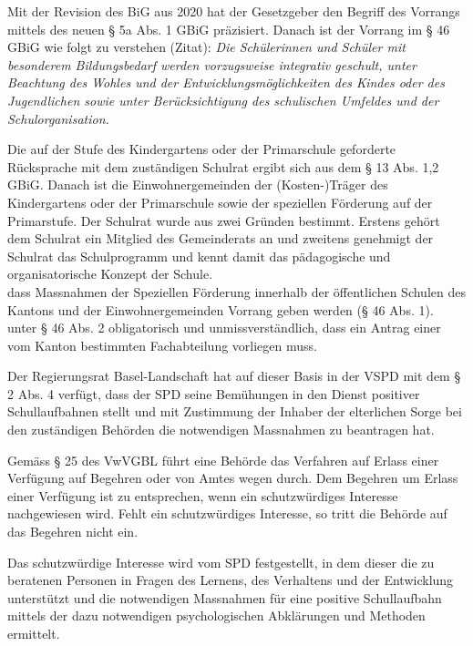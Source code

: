 \documentclass[paper=a4, onesite]{scrreprt}
\newcounter{rz}
\newcommand{\Rz}{\addtocounter{rz}{1}\marginpar{\texttt{(\textit{\arabic{rz}})}}}
\begin{document}
\Rz Mit der Revision des \ac{BiG} aus 2020 hat der Gesetzgeber den Begriff des Vorrangs mittels des neuen § 5a Abs. 1 \ac{GBiG} präzisiert. Danach ist der Vorrang im § 46 \ac{GBiG} wie folgt zu verstehen (Zitat): \textit{Die Schülerinnen und Schüler mit besonderem Bildungsbedarf werden vorzugsweise integrativ geschult, unter Beachtung des Wohles und der Entwicklungsmöglichkeiten des Kindes oder des Jugendlichen sowie unter Berücksichtigung des schulischen Umfeldes und der Schulorganisation.}\\

\Rz Die auf der Stufe des Kindergartens oder der Primarschule geforderte Rücksprache mit dem zuständigen Schulrat ergibt sich aus dem § 13 Abs. 1,2 \ac{GBiG}. Danach ist die Einwohnergemeinden der (Kosten-)Träger des Kindergartens oder der Primarschule sowie der speziellen Förderung auf der Primarstufe. Der Schulrat wurde aus zwei Gründen bestimmt. Erstens gehört dem Schulrat ein Mitglied des Gemeinderats an und zweitens genehmigt der Schulrat das Schulprogramm und kennt damit das pädagogische und organisatorische Konzept der Schule.\\

 


 dass Massnahmen der Speziellen Förderung innerhalb der öffentlichen Schulen des Kantons und der Einwohnergemeinden Vorrang geben werden (§ 46 Abs. 1). unter § 46 Abs. 2 obligatorisch und unmissverständlich, dass ein Antrag einer vom Kanton bestimmten Fachabteilung vorliegen muss.\\




\Rz Der Regierungsrat Basel-Landschaft hat auf dieser Basis in der \ac{VSPD} mit dem § 2 Abs. 4 verfügt, dass der \ac{SPD} seine Bemühungen in den Dienst positiver Schullaufbahnen stellt und mit Zustimmung der Inhaber der elterlichen Sorge bei den zuständigen Behörden die notwendigen Massnahmen zu beantragen hat.\\

\Rz Gemäss § 25 des \ac{VwVGBL}  führt eine Behörde das Verfahren auf Erlass einer Verfügung auf Begehren oder von Amtes wegen durch. Dem Begehren um Erlass einer Verfügung ist zu entsprechen, wenn ein schutzwürdiges Interesse nachgewiesen wird. Fehlt ein schutzwürdiges Interesse, so tritt die Behörde auf das Begehren nicht ein.\\

\Rz Das schutzwürdige Interesse wird vom \ac{SPD} festgestellt, in dem dieser die zu beratenen Personen in Fragen des Lernens, des Verhaltens und der Entwicklung unterstützt und die notwendigen Massnahmen für eine  positive Schullaufbahn mittels der dazu notwendigen psychologischen Abklärungen und Methoden ermittelt.
\end{document}
